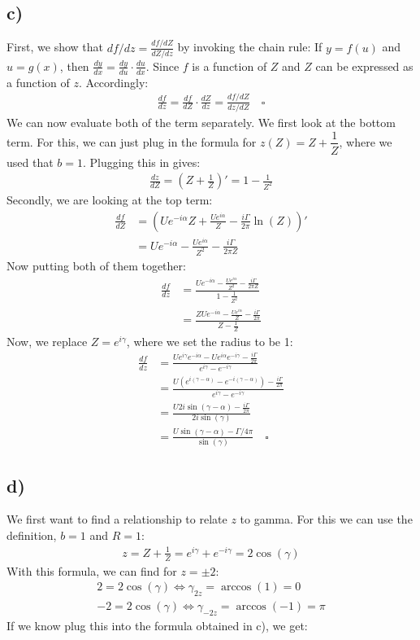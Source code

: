 \documentclass{article}
\begin{document}
\subsection*{c)}
First, we show that $df/dz=\frac{df/dZ}{dZ/dz}$ by invoking the chain rule: If $y=f(u)$ and $u=g(x)$, then $\frac{dy}{dx}=\frac{dy}{du}\cdot \frac{du}{dx}$. Since $f$ is a function of $Z$ and $Z$ can be expressed as a function of $z$. Accordingly:
\begin{align*}
    \frac{df}{dz}=\frac{df}{dZ}\cdot \frac{dZ}{dz}=\frac{df/dZ}{dz/dZ}\quad \square 
\end{align*}
We can now evaluate both of the term separately. We first look at the bottom term. For this, we can just plug in the formula for $z(Z)=Z+\dfrac{1}{Z}$, where we used that $b=1$. Plugging this in gives: 
\begin{align*}
    \frac{dz}{dZ}=(Z+\frac{1}{Z})'=1-\frac{1}{Z^2}
\end{align*}
Secondly, we are looking at the top term: 
\begin{align*}
    \frac{df}{dZ}&=\left( U e^{-i\alpha} Z + \frac{U e^{i\alpha}}{Z}- \frac{i\Gamma}{2\pi} \ln(Z)\right)'\\
&=U e^{-i\alpha} - \frac{U e^{i\alpha}}{Z^2}- \frac{i\Gamma}{2\pi Z} 
\end{align*}
Now putting both of them together: 
\begin{align*}
    \frac{df}{dz}&=\frac{U e^{-i\alpha} - \frac{U e^{i\alpha}}{Z^2}- \frac{i\Gamma}{2\pi Z} }{1-\frac{1}{Z^2}}\\
    &=\frac{ZU e^{-i\alpha} - \frac{U e^{i\alpha}}{Z}- \frac{i\Gamma}{2\pi} }{Z-\frac{1}{Z}}
\end{align*}
Now, we replace $Z=e^{i\gamma}$, where we set the radius to be 1: 
\begin{align*}
    \frac{df}{dz}&=\frac{Ue^{i\gamma} e^{-i\alpha} - {U e^{i\alpha}}e^{-i\gamma}- \frac{i\Gamma}{2\pi} }{e^{i\gamma}-e^{-i\gamma}}\\
    &=\frac{U(e^{i(\gamma-\alpha)}-e^{-i(\gamma-\alpha)})-\frac{i\Gamma}{2\pi} }{{e^{i\gamma}-e^{-i\gamma}}}\\
    &=\frac{U2i\sin(\gamma-\alpha )-\frac{i\Gamma}{2\pi}}{2i\sin (\gamma)}\\
    &=\frac{U\sin(\gamma -\alpha)-\Gamma/4\pi}{\sin(\gamma )} \quad \square 
\end{align*}

\subsection*{d)}
We first want to find a relationship to relate $z$ to gamma. For this we can use the definition, $b=1$ and $R=1$: 
\begin{align*}
    z=Z+\frac{1}{Z}=e^{i\gamma }+e^{-i\gamma }=2\cos(\gamma)
\end{align*}
With this formula, we can find for $z=\pm 2$:
\begin{align*}
    2=2\cos(\gamma )\Leftrightarrow \gamma_{2z} =\arccos (1)=0 \\
    -2=2\cos(\gamma )\Leftrightarrow \gamma_{-2z} =\arccos (-1)=\pi 
\end{align*}
If we know plug this into the formula obtained in c), we get: 
\end{document}

